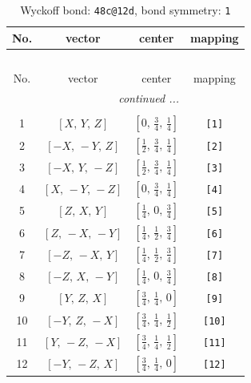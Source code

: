 \documentclass[fleqn,8pt]{jsarticle}
\begin{document}
\begin{longtable}{cccc}
\caption{Wyckoff bond: {\tt 48c@12d}, bond symmetry: {\tt 1}}
 \\
 \hline \hline
No. & vector & center & mapping \\ \hline \endfirsthead

\multicolumn{3}{l}{\tablename\ \thetable{}} \\
 \hline \hline
No. & vector & center & mapping \\ \hline \endhead

 \hline \hline
\multicolumn{3}{r}{\footnotesize\it continued ...} \\ \endfoot

 \hline \hline
\multicolumn{3}{r}{} \\ \endlastfoot

1 & $\left[ X,\, Y,\, Z \right]$ & $\left[ 0,\, \frac{3}{4},\, \frac{1}{4} \right]$ & {\tt [1]} \\ \hline
2 & $\left[ - X,\, - Y,\, Z \right]$ & $\left[ \frac{1}{2},\, \frac{3}{4},\, \frac{1}{4} \right]$ & {\tt [2]} \\ \hline
3 & $\left[ - X,\, Y,\, - Z \right]$ & $\left[ \frac{1}{2},\, \frac{3}{4},\, \frac{1}{4} \right]$ & {\tt [3]} \\ \hline
4 & $\left[ X,\, - Y,\, - Z \right]$ & $\left[ 0,\, \frac{3}{4},\, \frac{1}{4} \right]$ & {\tt [4]} \\ \hline
5 & $\left[ Z,\, X,\, Y \right]$ & $\left[ \frac{1}{4},\, 0,\, \frac{3}{4} \right]$ & {\tt [5]} \\ \hline
6 & $\left[ Z,\, - X,\, - Y \right]$ & $\left[ \frac{1}{4},\, \frac{1}{2},\, \frac{3}{4} \right]$ & {\tt [6]} \\ \hline
7 & $\left[ - Z,\, - X,\, Y \right]$ & $\left[ \frac{1}{4},\, \frac{1}{2},\, \frac{3}{4} \right]$ & {\tt [7]} \\ \hline
8 & $\left[ - Z,\, X,\, - Y \right]$ & $\left[ \frac{1}{4},\, 0,\, \frac{3}{4} \right]$ & {\tt [8]} \\ \hline
9 & $\left[ Y,\, Z,\, X \right]$ & $\left[ \frac{3}{4},\, \frac{1}{4},\, 0 \right]$ & {\tt [9]} \\ \hline
10 & $\left[ - Y,\, Z,\, - X \right]$ & $\left[ \frac{3}{4},\, \frac{1}{4},\, \frac{1}{2} \right]$ & {\tt [10]} \\ \hline
11 & $\left[ Y,\, - Z,\, - X \right]$ & $\left[ \frac{3}{4},\, \frac{1}{4},\, \frac{1}{2} \right]$ & {\tt [11]} \\ \hline
12 & $\left[ - Y,\, - Z,\, X \right]$ & $\left[ \frac{3}{4},\, \frac{1}{4},\, 0 \right]$ & {\tt [12]} \\ \hline

\end{longtable}
\end{document}
